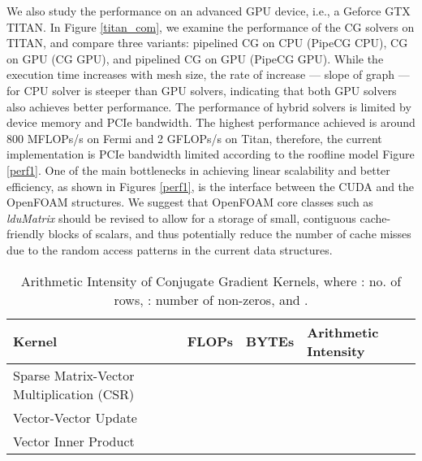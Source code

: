 \documentclass[3p,times]{elsarticle}
\begin{document}
We also study the performance on an advanced GPU device, i.e., a Geforce GTX TITAN. In Figure \ref{titan_com}, we examine the performance of the CG solvers on TITAN, and compare three variants: pipelined CG on CPU (PipeCG CPU), CG on GPU (CG GPU), and pipelined CG on GPU (PipeCG GPU). While the execution time increases with mesh size, the rate of increase --- slope of graph --- for CPU solver is steeper than GPU solvers, indicating that both GPU solvers also achieves better performance. The performance of hybrid solvers is limited by device memory and PCIe bandwidth. The highest performance achieved is around 800 MFLOPs/s on Fermi and 2 GFLOPs/s on Titan, therefore, the current implementation is PCIe bandwidth limited according to the roofline model Figure \ref{perf1}. One of the main bottlenecks in achieving linear scalability and better efficiency, as shown in Figures \ref{perf1}, is the interface between the CUDA and the OpenFOAM structures. We suggest that OpenFOAM core classes such as \emph{lduMatrix} should be revised to allow for a storage of small, contiguous cache-friendly blocks of scalars, and thus potentially reduce the number of cache misses due to the random access patterns in the current data structures. \\


 \begin{table}[h]
  \begin{center}
     \caption{Arithmetic Intensity of Conjugate Gradient Kernels, where \emph{}: no. of rows, \emph{}: number of non-zeros, and \emph{}.}
    \label{ai_cg}
    \begin{tabular}{ | l | l | l |  p{4cm} |}
    \hline
    Kernel & FLOPs & BYTEs & Arithmetic Intensity  \\ \hline
    Sparse Matrix-Vector Multiplication (CSR) & \emph{} & \emph{} & \emph{} \\ \hline
    Vector-Vector Update & \emph{} & \emph{} & \emph{} \\ \hline
    Vector Inner Product & \emph{} & \emph{} & \emph{} \\\hline
    \end{tabular}
    \end{center}
    \end{table}
\end{document}
